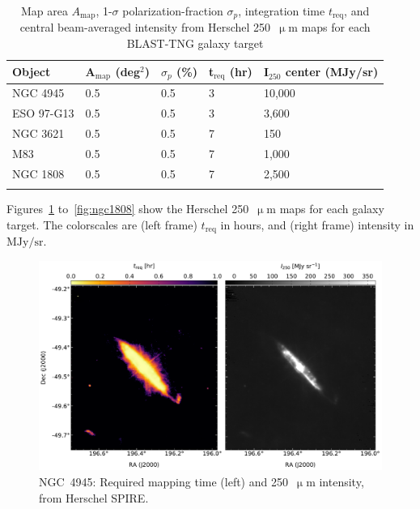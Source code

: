 \begin{table}[!htbp]
\centering
\begin{tabular}{@{}lllll@{}}
\dtoprule{}
Object & A$_{\mathrm{map}}$ (deg$^{2}$) & $\sigma_{p}$ (\%) & t$_{\mathrm{req}}$ (hr) & I$_{250}$ center (MJy/sr) \\ \midrule
NGC 4945 & 0.5 & 0.5 & 3 & 10,000 \\
ESO 97-G13 & 0.5 & 0.5 & 3 & 3,600 \\
NGC 3621 & 0.5 & 0.5 & 7 & 150 \\
M83 & 0.5 & 0.5 & 7 & 1,000 \\
NGC 1808 & 0.5 & 0.5 & 7 & 2,500 \\ \dbottomrule{}
\\
\end{tabular}
\caption[~Key mapping parameters for the BLAST-TNG external galaxy targets.]{Map area $A_{\mathrm{map}}$, 1-$\sigma$ polarization-fraction $\sigma_{p}$, integration time $t_{\mathrm{req}}$, and central beam-averaged intensity from Herschel 250~$\upmu$m maps for each BLAST-TNG galaxy target}
\label{table:treq}
\end{table}

Figures~\ref{fig:ngc4945} to~\ref{fig:ngc1808} show the Herschel 250~$\upmu$m maps for each galaxy target. The colorscales are (left frame) $t_{\mathrm{req}}$ in hours, and (right frame) intensity in $\mathrm{MJy/sr}$.

\begin{figure}[!htbp]
\centering
\includegraphics[width=\textwidth]{figures/galaxies/ngc4945}
\caption[~NGC 4945 required mapping time.]{NGC~4945: Required mapping time (left) and 250~$\upmu$m intensity, from Herschel SPIRE.}
\label{fig:ngc4945}
\end{figure}

